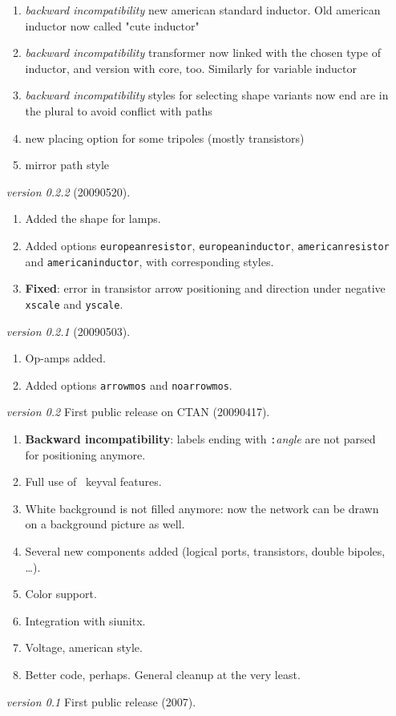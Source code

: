 \documentclass[a4paper]{article}
\begin{document}
\begin{itemize}
\begin{enumerate}
	\item \emph{backward incompatibility} new american standard inductor. Old american inductor now called "cute inductor"
	\item \emph{backward incompatibility} transformer now linked with the chosen type of inductor, and version with core, too. Similarly for variable inductor
	\item \emph{backward incompatibility} styles for selecting shape variants now end are in the plural to avoid conflict with paths
	\item new placing option for some tripoles (mostly transistors)
	\item mirror path style
\end{enumerate}
	
\item[\itshape version 0.2.2]  (20090520).
   \begin{enumerate}
		\item Added the shape for lamps.
		\item Added options \texttt{europeanresistor}, \texttt{europeaninductor}, \texttt{americanresistor} and \texttt{americaninductor}, with corresponding styles.
		\item \textbf{Fixed}: error in transistor arrow positioning and direction under negative \texttt{xscale} and \texttt{yscale}.
   \end{enumerate}   
   
   
\item[\itshape version 0.2.1]  (20090503).
   \begin{enumerate}
		\item Op-amps added.
		\item Added options \texttt{arrowmos} and \texttt{noarrowmos}.
   \end{enumerate}   


\item[\itshape version 0.2] First public release on CTAN (20090417).
   \begin{enumerate}
		\item \textbf{Backward incompatibility}: labels ending with \texttt{:}\textit{angle} are not parsed for positioning anymore.
		\item Full use of \TikZ\ keyval features.
		\item White background is not filled anymore: now the network can be drawn on a background picture as well.
		\item Several new components added (logical ports, transistors, double bipoles, \ldots).
		\item Color support.
		\item Integration with {\ttfamily siunitx}.
		\item Voltage, american style.
		\item Better code, perhaps. General cleanup at the very least.
   \end{enumerate}
\item[\itshape version 0.1] First public release (2007).
\end{itemize}


\printindex
\end{document}
